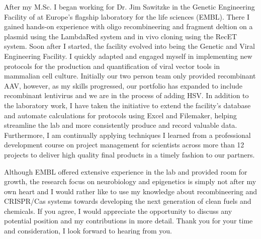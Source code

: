 \documentclass[11pt,a4paper,sans]{moderncv}
\begin{document}
\begin{spacing}{1.1}
After my M.Sc. I began working for Dr. Jim Sawitzke in the Genetic Engineering Facility of at Europe's flagship laboratory for the life sciences (EMBL). There I gained hands-on experience with oligo recombineering and fragment deltion on a plasmid using the LambdaRed system and { in vivo} cloning using the RecET system.
Soon after I started, the facility evolved into being the Genetic and Viral Engineering Facility. I quickly adapted and engaged myself in implementing new protocols for the production and quantification of viral vector tools in mammalian cell culture. 	
Initially our two person team only provided recombinant AAV, however, as my skills progressed, our portfolio has expanded to include recombinant lentivirus and we are in the process of adding HSV.
In addition to the laboratory work, I have taken the initiative to extend the facility's database and automate calculations for protocols using Excel and Filemaker, helping streamline the lab and more consistently produce and record valuable data. 
Furthermore, I am continually applying techniques I learned from a professional development course on project management for scientists across more than 12 projects to deliver high quality final products in a timely fashion to our partners.\par%

Although EMBL offered extensive experience in the lab and provided room for growth, the research focus on neurobiology and epigenetics is simply not after my own heart and I would rather like to use my knowledge about recombineering and CRISPR/Cas systems towards developing the next generation of clean fuels and chemicals.
If you agree, I would appreciate the opportunity to discuss any potential position and my contributions in more detail. 
Thank you for your time and consideration, I look forward to hearing from you.
 

 

\end{spacing}
\makeletterclosing
\end{document}
